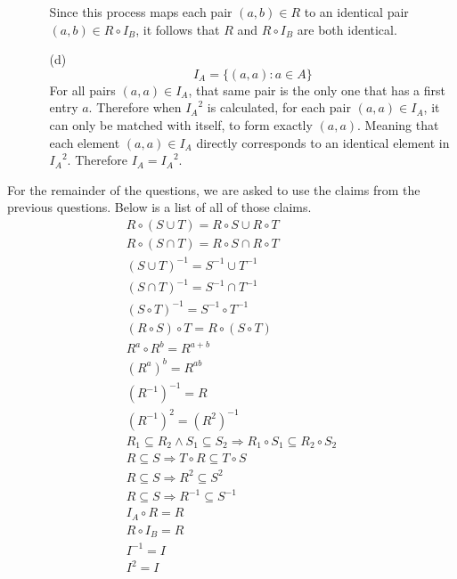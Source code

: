 \documentclass[fleqn]{article}
\begin{document}
\begin{enumerate}
\begin{enumerate}
		Since this process maps each pair \((a, b) \in R\) to an identical pair \((a, b) \in R \circ I_B\), it follows that \(R\) and \(R \circ I_B\) are both identical.
		
		\item[(d)]
		\[I_A = \{(a, a) : a \in A\}\]
		For all pairs \((a, a) \in I_A\), that same pair is the only one that has a first entry \(a\). Therefore when \({I_A}^2\) is calculated, for each pair \((a, a) \in I_A\), it can only be matched with itself, to form exactly \((a, a)\). Meaning that each element \((a, a) \in I_A\) directly corresponds to an identical element in \({I_A}^2\). Therefore \(I_A = {I_A}^2\).
	\end{enumerate}

\end{enumerate}

For the remainder of the questions, we are asked to use the claims from the previous questions. Below is a list of all of those claims.
\begin{gather}
	R \circ (S \cup T) = R \circ S \cup R \circ T \label{distrib. compos. over union}\\
	R \circ (S \cap T) = R \circ S \cap R \circ T \label{distrib. compos. over intersect.}\\
	(S \cup T)^{-1} = S^{-1} \cup T^{-1} \label{distrib. inverse over union}\\
	(S \cap T)^{-1} = S^{-1} \cap T^{-1} \label{distrib. inverse over intersect.}\\
	(S \circ T)^{-1} = S^{-1} \circ T^{-1} \label{distrib. inverse over compos.}\\
	(R \circ S) \circ T = R \circ (S \circ T) \label{assoc. compos.}\\
	R^a \circ R^b = R^{a+b} \label{sum exp.}\\
	(R^a)^b = R^{ab} \label{product exp.}\\
	(R^{-1})^{-1} = R \label{inverse of inverse}\\
	(R^{-1})^{2} = (R^{2})^{-1} \label{square of inverse}\\
	R_1 \subseteq R_2 \land S_1 \subseteq S_2 \Rightarrow R_1 \circ S_1 \subseteq R_2 \circ S_2 \label{compos. of subsets is subset}\\
	R \subseteq S \Rightarrow T \circ R \subseteq T \circ S \label{extend subset with composition}\\
	R \subseteq S \Rightarrow R^2 \subseteq S^2 \label{square subset}\\
	R \subseteq S \Rightarrow R^{-1} \subseteq S^{-1} \label{inverse subset}\\
	I_A \circ R = R \label{identity compos. left}\\
	R \circ I_B = R \label{identity compos. right}\\
	I^{-1} = I \label{inverse idetity}\\
	I^2 = I \label{square identity}
\end{gather}
\end{document}
